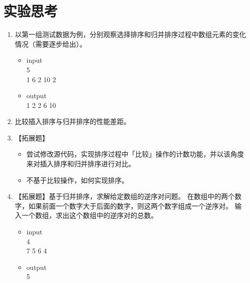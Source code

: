 \documentclass{article}
\begin{document}
\section{实验思考}
\begin{enumerate}
    \item 以第一组测试数据为例，分别观察选择排序和归并排序过程中数组元素的变化情况（需要逐步给出）。
    \begin{itemize}
        \item input \\ 5 \\ 1 6 2 10 2
        \item output \\ 1 2 2 6 10
    \end{itemize}
    
    \item 比较插入排序与归并排序的性能差距。
    \item 【拓展题】
    \begin{itemize}
        \item 尝试修改源代码，实现排序过程中「比较」操作的计数功能，并以该角度来对插入排序和归并排序进行对比。
        \item 不基于比较操作，如何实现排序。
    \end{itemize}

    \item 【拓展题】基于归并排序，求解给定数组的逆序对问题。
    在数组中的两个数字，如果前面一个数字大于后面的数字，则这两个数字组成一个逆序对。
    输入一个数组，求出这个数组中的逆序对的总数。
    \begin{itemize}
        \item input \\ 4 \\ 7 5 6 4
        \item output \\ 5
    \end{itemize}
    
\end{enumerate}
\end{document}
